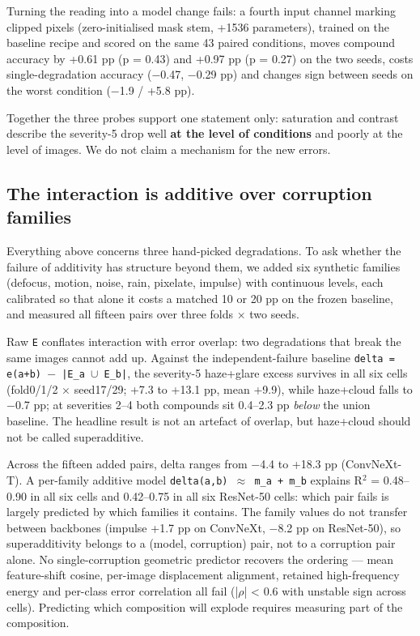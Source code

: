 Turning the reading into a model change fails: a fourth input channel marking clipped pixels (zero-initialised mask stem, +1536 parameters), trained on the baseline recipe and scored on the same 43 paired conditions, moves compound accuracy by +0.61 pp (p = 0.43) and +0.97 pp (p = 0.27) on the two seeds, costs single-degradation accuracy ($-$0.47, $-$0.29 pp) and changes sign between seeds on the worst condition ($-$1.9 / +5.8 pp).

Together the three probes support one statement only: saturation and contrast describe the severity-5 drop well \textbf{at the level of conditions} and poorly at the level of images. We do not claim a mechanism for the new errors.

\subsection{The interaction is additive over corruption families}
Everything above concerns three hand-picked degradations. To ask whether the failure of additivity has structure beyond them, we added six synthetic families (defocus, motion, noise, rain, pixelate, impulse) with continuous levels, each calibrated so that alone it costs a matched 10 or 20 pp on the frozen baseline, and measured all fifteen pairs over three folds $\times$ two seeds.

Raw \texttt{E} conflates interaction with error overlap: two degradations that break the same images cannot add up. Against the independent-failure baseline \texttt{delta = e(a+b) $-$ |E\_a $\cup$ E\_b|}, the severity-5 haze+glare excess survives in all six cells (fold0/1/2 $\times$ seed17/29; +7.3 to +13.1 pp, mean +9.9), while haze+cloud falls to $-$0.7 pp; at severities 2--4 both compounds sit 0.4--2.3 pp \emph{below} the union baseline. The headline result is not an artefact of overlap, but haze+cloud should not be called superadditive.

Across the fifteen added pairs, delta ranges from $-$4.4 to +18.3 pp (ConvNeXt-T). A per-family additive model \texttt{delta(a,b) $\approx$ m\_a + m\_b} explains R$^2$ = 0.48--0.90 in all six cells and 0.42--0.75 in all six ResNet-50 cells: which pair fails is largely predicted by which families it contains. The family values do not transfer between backbones (impulse +1.7 pp on ConvNeXt, $-$8.2 pp on ResNet-50), so superadditivity belongs to a (model, corruption) pair, not to a corruption pair alone. No single-corruption geometric predictor recovers the ordering --- mean feature-shift cosine, per-image displacement alignment, retained high-frequency energy and per-class error correlation all fail (|$\rho$| < 0.6 with unstable sign across cells). Predicting which composition will explode requires measuring part of the composition.

